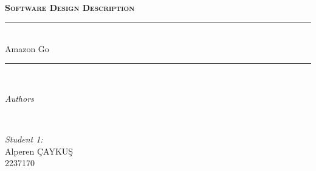 \begin{titlepage}

\newcommand{\HRule}{\rule{\linewidth}{0.5mm}} %




\center %

\textsc{}\\[3cm] %
\textsc{\Huge \bfseries Software Design Description}\\[1cm] %


\makeatletter
\HRule \\[0.4cm]
{ \LARGE  Amazon Go }\\[0.1cm] %
\HRule \\[4cm]
 

\begin{minipage}{0.4\textwidth}
\begin{flushleft} \large
\emph{Authors}\\
\@author %
\end{flushleft}
\end{minipage}
~
\begin{minipage}{0.4\textwidth}
\begin{flushright} \large
\emph{Student 1:} \\
Alperen ÇAYKUŞ \\[0.5em] %
2237170 \\[1.2em] %


\end{flushright}
\end{minipage}
\end{titlepage}
